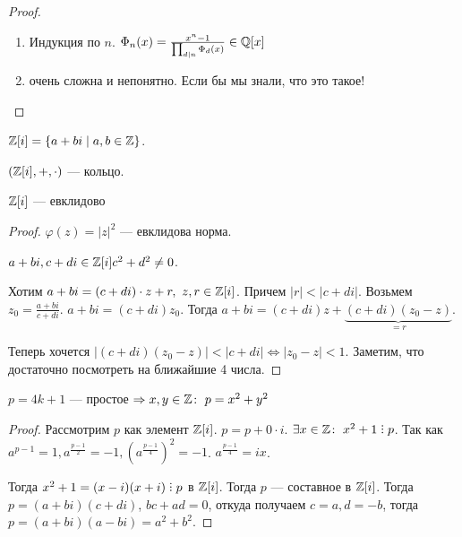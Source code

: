 \begin{proof}
    \begin{enumerate}
        \item Индукция по $n$.  $\Phi_n(x) = \frac{x^n - 1}{\prod_{d \mid n}\Phi_d(x)} \in \mathbb{Q}[x]$
        \item очень сложна и непонятно. Если бы мы знали, что это такое!
    \end{enumerate}
\end{proof}
\begin{definition}
    $\mathbb{Z}[i] = \{a + bi \mid a, b \in \mathbb{Z}\}$.
\end{definition}
\begin{statement}
    $(\mathbb{Z}[i], +, \cdot)$ --- кольцо.
\end{statement}
\begin{theorem}
    $\mathbb{Z}[i]$ --- евклидово
\end{theorem}
\begin{proof}
    $\varphi(z) = |z|^2$ --- евклидова норма.

    $a+bi, c+di \in \mathbb{Z}[i] c^2 + d^2 \neq 0$. 

    Хотим  $a+bi=(c+di)\cdot z +r,\ z,r \in \mathbb{Z}[i]$. Причем $|r| < |c+di|$. Возьмем  $z_0 = \frac{a+bi}{c+di}$. $a+bi = (c+di)z_0$. Тогда  $a+bi = (c+di)z + \underbrace{(c+di)(z_0-z)}_{=r}$. 

    Теперь хочется  $|(c+di)(z_0-z)| < |c+di| \iff |z_0 - z| < 1$. Заметим, что достаточно посмотреть на ближайшие 4 числа.
\end{proof}

\begin{theorem}
    $p = 4k + 1$ --- простое  $\Rightarrow x, y \in \mathbb{Z}\!:\ p = x^2+y^2$
\end{theorem}
\begin{proof}
    Рассмотрим $p$ как элемент  $\mathbb{Z}[i]$.  $p = p + 0 \cdot i$.  $\exists x \in \Z\!:\ x^2 + 1 \divby p$. Так как  $a^{p-1} = 1, a^{\frac{p - 1}{2}} = -1, (a^{\frac{p-1}{4}})^2 = -1$. $a^{\frac{p-1}{4}} = ix$.

    Тогда $x^2+1 = (x-i)(x+i) \divby p$ в  $\mathbb{Z}[i]$. Тогда  $p$ --- составное в  $\mathbb{Z}[i]$. Тогда  $p = (a+bi)(c+di)$,  $bc + ad = 0$, откуда получаем  $c = a, d = -b$, тогда  $p = (a+bi)(a-bi) = a^2+b^2$. 
\end{proof}
